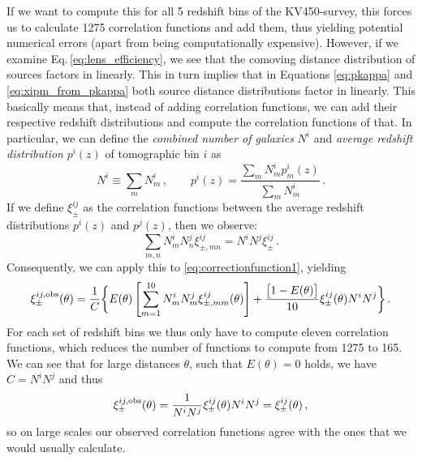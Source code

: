 If we want to compute this for all 5 redshift bins of the KV450-survey, this forces us to calculate 1275 correlation functions and add them, thus yielding potential numerical errors (apart from being computationally expensive). However, if we examine Eq.\,\eqref{eq:lens_efficiency}, we see that the comoving distance distribution of sources factors in linearly. This in turn implies that in Equations \eqref{eq:pkappa} and \eqref{eq:xipm_from_pkappa} both source distance distributions factor in linearly. This basically means that, instead of adding correlation functions, we can add their respective redshift distributions and compute the correlation functions of that. In particular, we can define the \textit{combined number of galaxies} $N^i$ and \textit{average redshift distribution} $p^i(z)$ of tomographic bin $i$ as \[
N^i\equiv\sum_m N_m^i\, , \qquad p^i(z) = \frac{\sum_m N_m^i p_m^i(z)}{\sum_m N_m^i} \, .
\]
If we define $\xi^{ij}_\pm$ as the correlation functions between the average redshift distributions $p^i(z)$ and $p^j(z)$, then we observe: \[
\sum_{m,n}N_m^iN_n^j\xi^{ij}_{\pm,mn} = N^iN^j\xi^{ij}_\pm\, .
\]
Consequently, we can apply this to \eqref{eq:correctionfunction1}, yielding
\begin{equation}
\xi_{\pm}^{ij,\rm{obs}}(\theta) = \frac{1}{C}\bigg\{ E(\theta)\left[\sum_{m=1}^{10} N_m^iN_m^j \xi_{\pm,mm}^{ij}(\theta)\right] +\frac{\big[1-E(\theta)\big]}{10}\xi_\pm^{ij}(\theta)N^iN^j\bigg\}\, .
\label{eq:correctionfunction2}
\end{equation}
For each set of redshift bins we thus only have to compute eleven correlation functions, which reduces the number of functions to compute from 1275 to 165. We can see that for large distances $\theta$, such that $E(\theta)=0$ holds, we have $C=N^iN^j$ and thus \[
\xi_{\pm}^{ij,\rm{obs}}(\theta) = \frac{1}{N^iN^j}\xi_\pm^{ij}(\theta)N^iN^j = \xi_\pm^{ij}(\theta)\, ,
\]
so on large scales our observed correlation functions agree with the ones that we would usually calculate.

